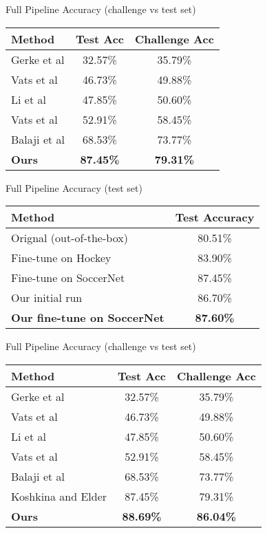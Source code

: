 \documentclass{article}
\begin{document}
Full Pipeline Accuracy (challenge vs test set)

\begin{tabular}{|l|c|c|}

\hline
\textbf{Method} & \textbf{Test Acc} & \textbf{Challenge Acc} \\
\hline
Gerke et al  & 32.57\% & 35.79\% \\
Vats et al  & 46.73\% & 49.88\% \\
Li et al    & 47.85\% & 50.60\% \\
Vats et al  & 52.91\% & 58.45\% \\
Balaji et al & 68.53\% & 73.77\% \\
\hline
\textbf{Ours}    & \textbf{87.45\%} & \textbf{79.31\%} \\
\hline
\end{tabular}

\vspace{1cm}

Full Pipeline Accuracy (test set)

\begin{tabular}{|l|c|}

  \hline
  \textbf{Method} & \textbf{Test Accuracy} \\
  \hline
  Orignal (out-of-the-box)  & 80.51\% \\
  Fine-tune on Hockey       & 83.90\% \\
  Fine-tune on SoccerNet    & 87.45\%  \\
  \hline
  Our initial run & 86.70\%  \\
  \textbf{Our fine-tune on SoccerNet} & \textbf{87.60\%}  \\
  \hline
  \end{tabular}

\vspace{1cm}

Full Pipeline Accuracy (challenge vs test set)

\begin{tabular}{|l|c|c|}

  \hline
  \textbf{Method} & \textbf{Test Acc} & \textbf{Challenge Acc} \\
  \hline
  Gerke et al  & 32.57\% & 35.79\% \\
  Vats et al  & 46.73\% & 49.88\% \\
  Li et al    & 47.85\% & 50.60\% \\
  Vats et al  & 52.91\% & 58.45\% \\
  Balaji et al & 68.53\% & 73.77\% \\
  \hline
  Koshkina and Elder & 87.45\% & 79.31\% \\
  \hline
  \textbf{Ours} & \textbf{88.69\%} & \textbf{86.04\%} \\
  \hline
  \end{tabular}
  
\end{document}
